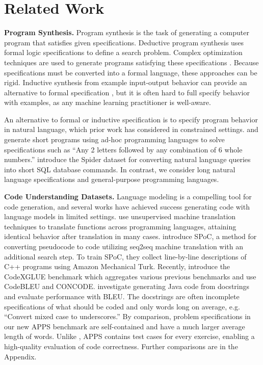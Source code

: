 \documentclass{article}
\begin{document}
\section{Related Work}

\textbf{Program Synthesis.}\quad
Program synthesis is the task of generating a computer program that satisfies given specifications.
Deductive program synthesis uses formal logic specifications to define a search problem. Complex optimization techniques are used to generate programs satisfying these specifications \citep{alur2018sygus}. Because specifications must be converted into a formal language, these approaches can be rigid. Inductive synthesis from example input-output behavior can provide an alternative to formal specification \citep{Cai2017MakingNP,Gulwani2017ProgramS}, but it is often hard to full specify behavior with examples, as any machine learning practitioner is well-aware.

An alternative to formal or inductive specification is to specify program behavior in natural language, which prior work has considered in constrained settings.
\citet{Raza2015CompositionalPS} and \citet{desai2016program} generate short programs using ad-hoc programming languages to solve specifications such as ``Any 2 letters followed by any combination of 6 whole numbers.'' \citet{yu2018spider} introduce the Spider dataset for converting natural language queries into short SQL database commands. In contrast, we consider long natural language specifications and general-purpose programming languages.








\textbf{Code Understanding Datasets.}\quad
Language modeling is a compelling tool for code generation, and several works have achieved success generating code with language models in limited settings. \citet{lachaux2020unsupervised} use unsupervised machine translation techniques to translate functions across programming languages, attaining identical behavior after translation in many cases. \citet{NEURIPS2019_7298332f} introduce SPoC, a method for converting pseudocode to code utilizing seq2seq machine translation with an additional search step. To train SPoC, they collect line-by-line descriptions of C++ programs using Amazon Mechanical Turk. Recently, \citet{Lu2021CodeXGLUEAM} introduce the CodeXGLUE benchmark which aggregates various previous benchmarks and use CodeBLEU \citep{Ren2020CodeBLEUAM} and CONCODE. \citet{iyer-etal-2018-mapping} investigate generating Java code from docstrings and evaluate performance with BLEU. The docstrings are often incomplete specifications of what should be coded and only  words long on average, e.g. ``Convert mixed case to underscores.'' By comparison, problem specifications in our new APPS benchmark are self-contained and have a much larger average length of  words. Unlike \citet{iyer-etal-2018-mapping}, APPS contains test cases for every exercise, enabling a high-quality evaluation of code correctness. Further comparisons are in the Appendix.
\end{document}
